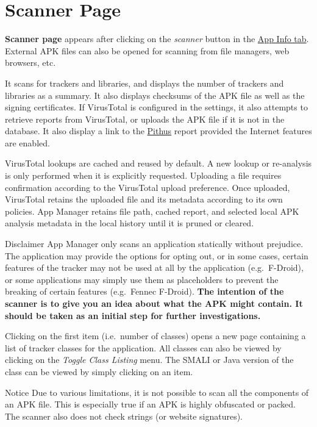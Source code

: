 \section{Scanner Page}\label{sec:scanner-page} %
\textbf{Scanner page} appears after clicking on the \emph{scanner} button in the \hyperref[subsec:app-info-tab]{App Info tab}.
External APK files can also be opened for scanning from file managers, web browsers, etc.

It scans for trackers and libraries, and displays the number of trackers and libraries as a summary.
It also displays checksums of the APK file as well as the signing certificates. If VirusTotal is
configured in the settings, it also attempts to retrieve reports from VirusTotal, or uploads the APK
file if it is not in the database. It also display a link to the \href{https://beta.pithus.org}{Pithus}
report provided the Internet features are enabled.

VirusTotal lookups are cached and reused by default. A new lookup or re-analysis is only performed
when it is explicitly requested. Uploading a file requires confirmation according to the VirusTotal
upload preference. Once uploaded, VirusTotal retains the uploaded file and its metadata according to
its own policies. App Manager retains file path, cached report, and selected local APK analysis
metadata in the local history until it is pruned or cleared.

\begin{danger}{Disclaimer}
    App Manager only scans an application statically without prejudice. The application may provide
    the options for opting out, or in some cases, certain features of the tracker may not be used at
    all by the application (e.g.\ F-Droid), or some applications may simply use them as placeholders
    to prevent the breaking of certain features (e.g.\ Fennec F-Droid). \textbf{The intention of the
    scanner is to give you an idea about what the APK might contain. It should be taken as an
    initial step for further investigations.}
\end{danger}

Clicking on the first item (i.e.\ number of classes) opens a new page containing a list of tracker
classes for the application. All classes can also be viewed by clicking on the \textit{Toggle Class
Listing} menu. The SMALI or Java version of the class can be viewed by simply clicking on an item.

\begin{tip}{Notice}
    Due to various limitations, it is not possible to scan all the components of an APK file. This
    is especially true if an APK is highly obfuscated or packed. The scanner also does not check
    strings (or website signatures).
\end{tip}

